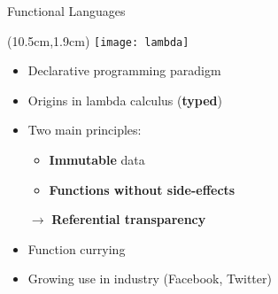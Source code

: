 \begin{frame}{Functional Languages}
	\begin{textblock*}{2cm}(10.5cm,1.9cm)
		\texttt{[image: lambda]}
	\end{textblock*}
	\begin{itemize}
		\item Declarative programming paradigm
		\item Origins in lambda calculus (\textbf{typed})
		\item<2-> Two main principles:
		\begin{itemize}
			\item<2-> \textbf{Immutable} data
			\item<2-> \textbf{Functions without side-effects}
		\end{itemize}
		$\rightarrow$ \textbf{Referential transparency}
		\item<3-> Function currying
		\item<4-> Growing use in industry (Facebook, Twitter)
	\end{itemize}
\end{frame}